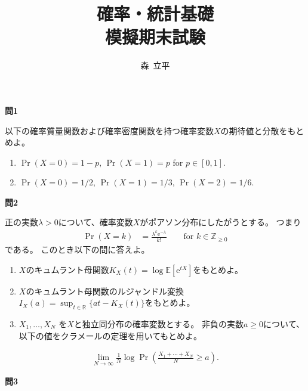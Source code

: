 \documentclass[lualatex,ja=standard,a4paper]{bxjsarticle}
\title{確率・統計基礎\\
模擬期末試験}
\author{森~立平}
\date{}
\theoremstyle{definition}
\theoremstyle{remark}
\begin{document}
\maketitle


\vspace{1em}
{\noindent\large\bfseries 問1}

\vspace{1em}
以下の確率質量関数および確率密度関数を持つ確率変数$X$の期待値と分散をもとめよ。

\vspace{1em}
\begin{enumerate}[label=(\arabic*)]
\setlength{\itemsep}{1em}
\item
$\Pr(X=0)=1-p,\,\Pr(X=1)=p$ for $p\in[0,1]$.
\item
$\Pr(X=0)=1/2,\,\Pr(X=1)=1/3,\,\Pr(X=2)=1/6$.
\end{enumerate}

\vspace{1em}
{\noindent\large\bfseries 問2}

\vspace{1em}
正の実数$\lambda>0$について、確率変数$X$がポアソン分布にしたがうとする。
つまり
\begin{align*}
\Pr(X = k) &=  \frac{\lambda^k\mathrm{e}^{-\lambda}}{k!}\qquad \text{for } k\in\mathbb{Z}_{\ge 0}
\end{align*}
である。
このとき以下の問に答えよ。
\vspace{1em}
\begin{enumerate}[label=(\arabic*)]
\setlength{\itemsep}{1em}
\item $X$のキュムラント母関数$K_X(t)=\log\mathbb{E}[\mathrm{e}^{tX}]$をもとめよ。
\item $X$のキュムラント母関数のルジャンドル変換$I_X(a) = \sup_{t\in\mathbb{R}}\{at - K_X(t)\}$をもとめよ。
\item $X_1,\dotsc,X_N$ を$X$と独立同分布の確率変数とする。
非負の実数$a\ge0$について、以下の値をクラメールの定理を用いてもとめよ。
\end{enumerate}
\begin{align*}
\lim_{N\to\infty}\frac1N\log\Pr\left(\frac{X_1+\dotsb+X_N}{N} \ge a\right).
\end{align*}


\newpage
{\noindent\large\bfseries 問3}
\end{document}
